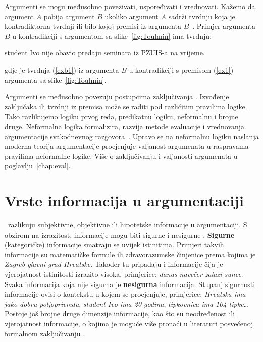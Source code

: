 Argumenti se mogu međusobno povezivati, uspoređivati i vrednovati.  Kažemo da
argument $A$ pobija  argument $B$ ukoliko argument $A$ sadrži
tvrdnju koja je kontradiktorna tvrdnji ili bilo kojoj premisi iz argumenta
$B$~\citep{besnard2008elements}. Primjer argumenta $B$ u kontradikciji s
argumentom sa slike~\ref{fig:Toulmin} ima tvrdnju:
\begin{exe}
    \ex\label{exb1} student Ivo nije obavio predaju seminara iz PZUIS-a na vrijeme. 
\end{exe}
gdje je tvrdnja (\ref{exb1}) iz argumenta $B$ u kontradikciji s premisom (\ref{ex1})
argumenta sa slike~\ref{fig:Toulmin}. 

Argumenti se međusobno povezuju postupcima zaključivanja . 
Izvođenje zaključaka ili tvrdnji iz premisa može se raditi pod različitim pravilima 
logike. 
Tako razlikujemo logiku prvog reda, predikatnu logiku, neformalnu i brojne druge. 
Neformalna logika  formalizira, 
razvija metode evaluacije i vrednovanja
argumentacije svakodnevnog razgovora~\citep{fogelin1985logic, blair2000informal}. 
Upravo se na neformalnu logiku naslanja moderna teorija argumentacije procjenjuje
valjanost argumenata u raspravama pravilima neformalne logike.
Više o zaključivanju i valjanosti argumenata u poglavlju~\ref{chap:eval}.

\section{Vrste informacija u argumentaciji}

\cite{besnard2008elements}~razlikuju subjektivne, objektivne ili hipotetske informacije u 
argumentaciji. 
S obzirom na izrazitost, informacije mogu biti 
sigurne  i nesigurne . \textbf{Sigurne} (kategoričke)
informacije smatraju se uvijek istinitima. Primjeri takvih informacije su
matematičke formule ili zdravorazumske činjenice prema kojima je \emph{Zagreb glavni
grad Hrvatske}. Također tu pripadaju i informacije čija je vjerojatnost istinitosti 
izrazito visoka, primjerice: \emph{danas navečer zalazi sunce}. Svaka informacija 
koja nije sigurna je \textbf{nesigurna} informacija. Stupanj sigurnosti informacije
ovisi o kontekstu u kojem se procjenjuje, primjerice: \emph{Hrvatska ima jako dobru poljoprivredu},  
\emph{student Ivo ima 20 godina}, \emph{tipkovnica ima 104 tipke}\dots \@
Postoje još brojne druge dimenzije informacije, kao što
su neodređenost ili vjerojatnost informacije, o kojima je moguće 
više pronaći u literaturi posvećenoj formalnom zaključivanju
\citep{wang2004ontology}. 


